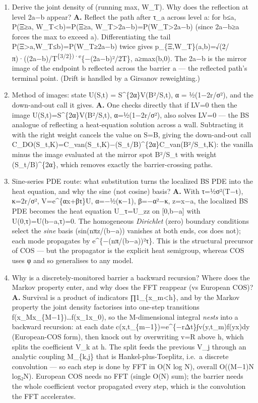 \documentclass[
  11pt,
]{article}
\begin{document}
\begin{enumerate}
  has the law of \textbar W\_T\textbar, with density
  p\_Ξ(a)=√(2/πT)·e\^{}\{−a²/2T\}, a≥0.
\item
  Derive the joint density of (running max, W\_T). Why does the
  reflection at level 2a−b appear? \textbf{A.} Reflect the path after
  τ\_a across level a: for b≤a, P(Ξ≥a, W\_T\textless b)=P(Ξ≥a,
  W\_T\textgreater2a−b)=P(W\_T\textgreater2a−b) (since 2a−b≥a forces the
  max to exceed a). Differentiating the tail
  P(Ξ\textgreater a,W\_T≤b)=P(W\_T≥2a−b) twice gives
  p\_\{Ξ,W\_T\}(a,b)=√(2/π)·((2a−b)/T\textsuperscript{\{3/2\})·e}\{−(2a−b)²/2T\},
  a≥max(b,0). The 2a−b is the mirror image of the endpoint b reflected
  across the barrier a --- the reflected path's terminal point. (Drift
  is handled by a Girsanov reweighting.)
\item
  Method of images: state U(S,t) = S\^{}\{2α\}V(B²/S,t), α = ½(1−2r/σ²),
  and the down-and-out call it gives. \textbf{A.} One checks directly
  that if LV=0 then the image U(S,t)=S\^{}\{2α\}V(B²/S,t), α=½(1−2r/σ²),
  also solves LV=0 --- the BS analogue of reflecting a heat-equation
  solution across a wall. Subtracting it with the right weight cancels
  the value on S=B, giving the down-and-out call
  C\_DO(S\_t,K)=C\_van(S\_t,K)−(S\_t/B)\^{}\{2α\}C\_van(B²/S\_t,K): the
  vanilla minus the image evaluated at the mirror spot B²/S\_t with
  weight (S\_t/B)\^{}\{2α\}, which removes exactly the barrier-crossing
  paths.
\item
  Sine-series PDE route: what substitution turns the localized BS PDE
  into the heat equation, and why the sine (not cosine) basis?
  \textbf{A.} With τ=½σ²(T−t), κ=2r/σ², V=e\^{}\{αx+βτ\}U, α=−½(κ−1),
  β=−α²−κ, z=x−a, the localized BS PDE becomes the heat equation
  U\_τ=U\_zz on {[}0,b−a{]} with U(0,τ)=U(b−a,τ)=0. The homogeneous
  \emph{Dirichlet} (zero) boundary conditions select the \emph{sine}
  basis (sin(nπz/(b−a)) vanishes at both ends, cos does not); each mode
  propagates by e\^{}\{−(nπ/(b−a))²τ\}. This is the structural precursor
  of COS --- but the propagator is the explicit heat semigroup, whereas
  COS uses φ and so generalises to any model.
\item
  Why is a discretely-monitored barrier a backward recursion? Where does
  the Markov property enter, and why does the FFT reappear (vs European
  COS)? \textbf{A.} Survival is a product of indicators
  ∏1\_\{x\_m\textless h\}, and by the Markov property the joint density
  factorises into one-step transitions
  f(x\_M\textbar x\_\{M−1\})\ldots f(x\_1\textbar x\_0), so the
  M-dimensional integral \emph{nests} into a backward recursion: at each
  date c(x,t\_\{m−1\})=e\^{}\{−rΔt\}∫v(y,t\_m)f(y\textbar x)dy
  (European-COS form), then knock out by overwriting v=R above h, which
  splits the coefficient V\_k at h. The split feeds the previous V\_j
  through an analytic coupling M\_\{k,j\} that is Hankel-plus-Toeplitz,
  i.e.~a discrete convolution --- so each step is done by FFT in O(N log
  N), overall O((M−1)N log₂N). European COS needs no FFT (single O(N)
  sum); the barrier needs the whole coefficient vector propagated every
  step, which is the convolution the FFT accelerates.
\end{enumerate}
\end{document}
